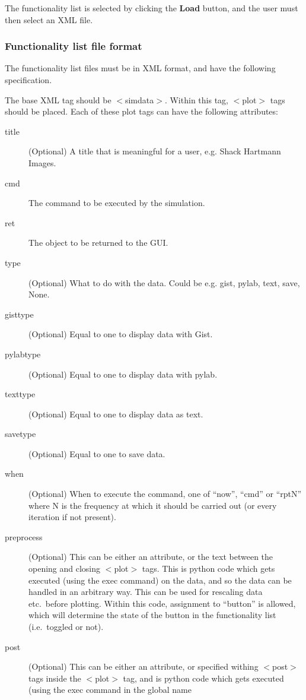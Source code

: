 \documentclass{article}
\begin{document}
The functionality list is selected by clicking the {\bf Load} button,
and the user must then select an XML file.

\subsubsection{Functionality list file format}
The functionality list files must be in XML format, and have the
following specification.

The base XML tag should be $<$simdata$>$.  Within this tag, $<$plot$>$ tags
should be placed.  Each of these plot tags can have the following
attributes:

\begin{description}
\item[title] (Optional) A title that is meaningful for a user, e.g. Shack
  Hartmann Images.
\item[cmd] The command to be executed by the simulation.
\item[ret] The object to be returned to the GUI.
\item[type] (Optional) What to do with the data.  Could be e.g. gist, pylab,
  text, save, None.
\item[gisttype] (Optional) Equal to one to display data with Gist.
\item[pylabtype] (Optional) Equal to one to display data with pylab.
\item[texttype] (Optional) Equal to one to display data as text.
\item[savetype] (Optional) Equal to one to save data.
\item[when] (Optional) When to execute the command, one of ``now'', ``cmd'' or
  ``rptN'' where N is the frequency at which it should be carried out
  (or every iteration if not present).
\item[preprocess] (Optional) This can be either an attribute, or the
  text between the opening and closing $<$plot$>$ tags.  This is python
  code which gets executed (using the exec command) on the data, and
  so the data can be handled in an arbitrary way.  This can be used
  for rescaling data etc.\ before plotting.  Within this code,
  assignment to ``button'' is allowed, which will determine the state
  of the button in the functionality list (i.e.\ toggled or not).
\item[post] (Optional) This can be either an attribute, or specified
  withing $<$post$>$ tags inside the $<$plot$>$ tag, and is python
  code which gets executed (using the exec command in the global name

\end{description}
\end{document}
